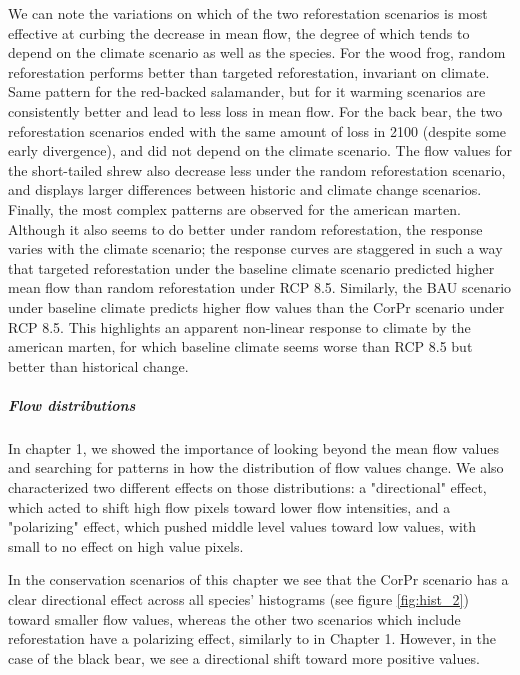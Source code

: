 {We can note the variations on which of the two reforestation scenarios is most effective at curbing the decrease in mean flow, the degree of which tends to depend on the climate scenario as well as the species. For the wood frog, random reforestation performs better than targeted reforestation, invariant on climate. Same pattern for the red-backed salamander, but for it warming scenarios are consistently better and lead to less loss in mean flow. For the back bear, the two reforestation scenarios ended with the same amount of loss in 2100 (despite some early divergence), and did not depend on the climate scenario. The flow values for the short-tailed shrew also decrease less under the random reforestation scenario, and displays larger differences between historic and climate change scenarios. Finally, the most complex patterns are observed for the american marten. Although it also seems to do better under random reforestation, the response varies with the climate scenario; the response curves are staggered in such a way that targeted reforestation under the baseline climate scenario predicted higher mean flow than random reforestation under RCP 8.5. Similarly, the BAU scenario under baseline climate predicts higher flow values than the CorPr scenario under RCP 8.5. This highlights an apparent non-linear response to climate by the american marten, for which baseline climate seems worse than RCP 8.5 but better than historical change.

\vspace{1em}

\subparagraph*{\textit{Flow distributions}} In chapter 1, we showed the importance of looking beyond the mean flow values and searching for patterns in how the distribution of flow values change. We also characterized two different effects on those distributions: a "directional" effect, which acted to shift high flow pixels toward lower flow intensities, and a "polarizing" effect, which pushed middle level values toward low values, with small to no effect on high value pixels.

In the conservation scenarios of this chapter we see that the CorPr scenario has a clear directional effect across all species' histograms (see figure \ref{fig:hist_2}) toward smaller flow values, whereas the other two scenarios which include reforestation have a polarizing effect, similarly to in Chapter 1. However, in the case of the black bear, we see a directional shift toward more positive values.

\vspace{1em}

}
